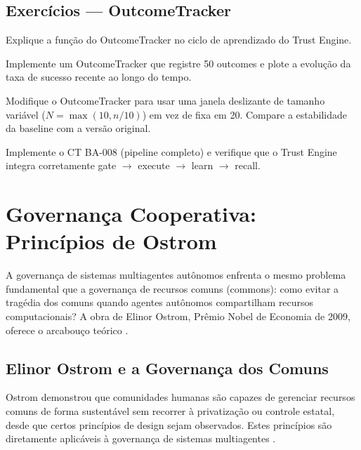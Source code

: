 \subsection{Exercícios — OutcomeTracker}
\begin{exercicio}
Explique a função do OutcomeTracker no ciclo de aprendizado do Trust
Engine.
\end{exercicio}
\begin{exercicio}
Implemente um OutcomeTracker que registre 50 outcomes e plote a
evolução da taxa de sucesso recente ao longo do tempo.
\end{exercicio}
\begin{exercicio}
Modifique o OutcomeTracker para usar uma janela deslizante de tamanho
variável ($N = \max(10, n/10)$) em vez de fixa em 20. Compare a
estabilidade da baseline com a versão original.
\end{exercicio}
\begin{exercicio}
Implemente o CT BA-008 (pipeline completo) e verifique que o Trust
Engine integra corretamente gate $\to$ execute $\to$ learn $\to$
recall.
\end{exercicio}

\section{Governança Cooperativa: Princípios de Ostrom}
\label{sec:governanca-ostrom}
\nivelphd

A governança de sistemas multiagentes autônomos enfrenta o mesmo
problema fundamental que a governança de recursos comuns (commons):
como evitar a tragédia dos comuns quando agentes autônomos compartilham
recursos computacionais? A obra de Elinor Ostrom, Prêmio Nobel de
Economia de 2009, oferece o arcabouço teórico \cite{ostrom1990governing}.

\subsection{Elinor Ostrom e a Governança dos Comuns}

Ostrom demonstrou que comunidades humanas são capazes de gerenciar
recursos comuns de forma sustentável sem recorrer à privatização ou
controle estatal, desde que certos princípios de design sejam
observados. Estes princípios são diretamente aplicáveis à governança
de sistemas multiagentes \cite{ostrom1990governing, opencode2026spec036}.

